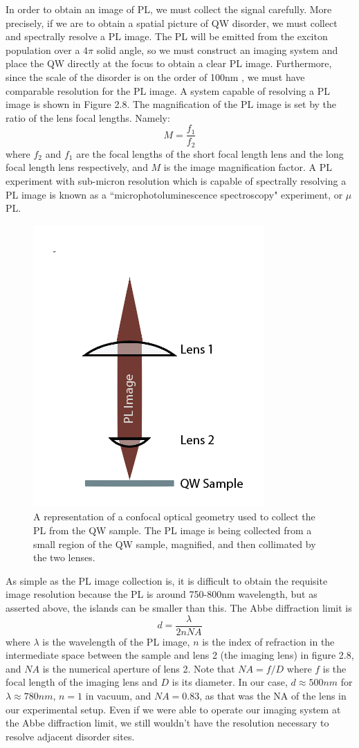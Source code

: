 \indent In order to obtain an image of PL, we must collect the signal carefully. More precisely, if we are to obtain a spatial picture of QW disorder, we must collect and spectrally resolve a PL image. The PL will be emitted from the exciton population over a $4 \pi$ solid angle, so we must construct an imaging system and place the QW directly at the focus to obtain a clear PL image. Furthermore, since the scale of the disorder is on the order of 100nm \cite{yoshitaterrace}, we must have comparable resolution for the PL image. A system capable of resolving a PL image is shown in Figure 2.8. The magnification of the PL image is set by the ratio of the lens focal lengths. Namely:
\begin{equation}
M = \frac{f_1}{f_2}
\end{equation}
where $f_2$ and $f_1$ are the focal lengths of the short focal length lens and the long focal length lens respectively, and $M$ is the image magnification factor. A PL experiment with sub-micron resolution which is capable of spectrally resolving a PL image is known as a ``microphotoluminescence spectroscopy" experiment, or $\mu$PL.
\begin{figure}[h!]
\label{confocal}
\centering
\includegraphics[width = .3\textwidth]{confocal1.png}
\caption{\doublespacing A representation of a confocal optical geometry used to collect the PL from the QW sample. The PL image is being collected from a small region of the QW sample, magnified, and then collimated by the two lenses.}
\end{figure}

\indent As simple as the PL image collection is, it is difficult to obtain the requisite image resolution because the PL is around 750-800nm wavelength, but as asserted above, the islands can be smaller than this. The Abbe diffraction limit is
\begin{equation}
d = \frac{\lambda}{2nNA}
\end{equation}
where $\lambda$ is the wavelength of the PL image, $n$ is the index of refraction in the intermediate space between the sample and lens 2 (the imaging lens) in figure 2.8, and $NA$ is the numerical aperture of lens 2. Note that $NA = f / D$ where $f$ is the focal length of the imaging lens and $D$ is its diameter. In our case, $d \approx 500 nm$ for $\lambda \approx 780 nm$, $n = 1$ in vacuum, and $NA = 0.83$, as that was the NA of the lens in our experimental setup. Even if we were able to operate our imaging system at the Abbe diffraction limit, we still wouldn't have the resolution necessary to resolve adjacent disorder sites.

